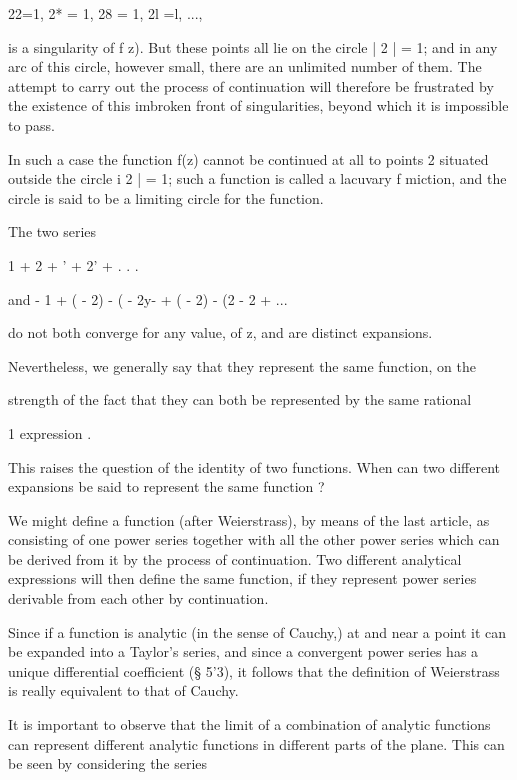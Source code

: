 {{22=1, 2* = 1, 28 = 1, 2l =l, ...,

is a singularity of f z). But these points all lie on the circle | 2 |
= 1; and in any arc of this circle, however small, there are an
unlimited number of them. The attempt to carry out the process of
continuation will therefore be frustrated by the existence of this
imbroken front of singularities, beyond which it is impossible to
pass.

In such a case the function f(z) cannot be continued at all to points
2 situated outside the circle i 2 | = 1; such a function is called a
lacuvary f miction, and the circle is said to be a limiting circle for
the function.


The two series

1 + 2 + ' + 2' + . . .

and - 1 + ( - 2) - ( - 2y- + ( - 2) - (2 - 2 + ...

do not both converge for any value, of z, and are distinct expansions.

Nevertheless, we generally say that they represent the same function,
on the

strength of the fact that they can both be represented by the same
rational

1 expression .

%
%

This raises the question of the identity of two functions. When can
two different expansions be said to represent the same function ?

We might define a function (after Weierstrass), by means of the last
article, as consisting of one power series together with all the other
power series which can be derived from it by the process of
continuation. Two different analytical expressions will then define
the same function, if they represent power series derivable from each
other by continuation.

Since if a function is analytic (in the sense of Cauchy,) at
and near a point it can be expanded into a Taylor's series, and since
a convergent power series has a unique differential coefficient (§
5'3), it follows that the definition of Weierstrass is really
equivalent to that of Cauchy.

It is important to observe that the limit of a combination of analytic
functions can represent different analytic functions in different
parts of the plane. This can be seen by considering the series

}}
